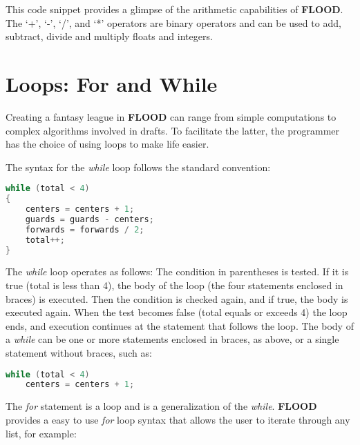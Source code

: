 \documentclass[12pt]{report}
\begin{document}
\begin{doublespace}
This code snippet provides a glimpse of the arithmetic capabilities of \textbf{FLOOD}. The `+', `-', `/', and `*' operators are binary operators and can be used to add, subtract, divide and multiply floats and integers.
\end{doublespace}

\section{Loops: For and While}

\begin{doublespace}
Creating a fantasy league in \textbf{FLOOD} can range from simple computations to complex algorithms involved in drafts. To facilitate the latter, the programmer has the choice of using loops to make life easier.

The syntax for the \textit{while} loop follows the standard convention:
\end{doublespace}

\begin{lstlisting}[language=Java,label=some-code,caption=While loop]
while (total < 4)
{
	centers = centers + 1;
	guards = guards - centers;
	forwards = forwards / 2;
	total++;
}
\end{lstlisting}

\begin{doublespace}
The \textit{while} loop operates as follows: The condition in parentheses is tested. If it is true (total is less than 4), the body of the loop (the four statements enclosed in braces) is executed. Then the condition is checked again, and if true, the body is executed again. When the test becomes false (total equals or exceeds 4) the loop ends, and execution continues at the statement that follows the loop. The body of a \textit{while} can be one or more statements enclosed in braces, as above, or a single statement without braces, such as:
\end{doublespace}

\begin{lstlisting}[language=Java,label=some-code,caption=Single statement while loop]
while (total < 4)
	centers = centers + 1;
\end{lstlisting}

\begin{doublespace}
The \textit{for} statement is a loop and is a generalization of the \textit{while}. \textbf{FLOOD} provides a easy to use \textit{for} loop syntax that allows the user to iterate through any list, for example:
\end{doublespace}
\end{document}
